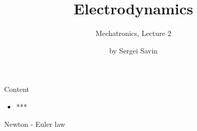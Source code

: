 \documentclass{beamer}
\title{Electrodynamics}
\subtitle{Mechatronics, Lecture 2}
\author{by Sergei Savin}
\date{\mydate}
\begin{document}
\maketitle



\begin{frame}{Content}
\begin{itemize}
\item ***
\end{itemize}
\end{frame}



\begin{frame}{Newton - Euler law}
\begin{flushleft}



\end{flushleft}
\end{frame}




\myqrframe
\end{document}
